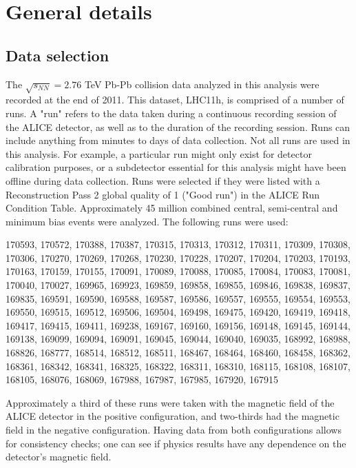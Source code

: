 \section{General details}
\label{sec:GeneralDetails}



\subsection{Data selection}
\label{sec:DataSelection}

The $\sqrt{s_{NN}}=2.76$ TeV Pb-Pb collision data analyzed in this analysis were recorded at the end of 2011.
This dataset, LHC11h, is comprised of a number of runs.
A "run" refers to the data taken during a continuous recording session of the ALICE detector, as well as to the duration of the recording session.
Runs can include anything from minutes to days of data collection.
Not all runs are used in this analysis.
For example, a particular run might only exist for detector calibration purposes, or a subdetector essential for this analysis might have been offline during data collection.
Runs were selected if they were listed with a Reconstruction Pass 2 global quality of 1 ("Good run") in the ALICE Run Condition Table. 
Approximately 45 million combined central, semi-central and minimum bias events were analyzed. 
The following runs were used:

170593, 170572, 170388, 170387, 170315, 170313, 170312, 170311, 170309, 170308, 170306, 170270, 170269, 170268, 170230, 170228, 170207, 170204, 170203, 170193, 170163, 170159, 170155, 170091, 170089, 170088, 170085, 170084, 170083, 170081, 170040, 170027, 169965, 169923, 169859, 169858, 169855, 169846, 169838, 169837, 169835, 169591, 169590, 169588, 169587, 169586, 169557, 169555, 169554, 169553, 169550, 169515, 169512, 169506, 169504, 169498, 169475, 169420, 169419, 169418, 169417, 169415, 169411, 169238, 169167, 169160, 169156, 169148, 169145, 169144, 169138, 169099, 169094, 169091, 169045, 169044, 169040, 169035, 168992, 168988, 168826, 168777, 168514, 168512, 168511, 168467, 168464, 168460, 168458, 168362, 168361, 168342, 168341, 168325, 168322, 168311, 168310, 168115, 168108, 168107, 168105, 168076, 168069, 167988, 167987, 167985, 167920, 167915

Approximately a third of these runs were taken with the magnetic field of the ALICE detector in the positive configuration, and two-thirds had the magnetic field in the negative configuration.
Having data from both configurations allows for consistency checks; one can see if physics results have any dependence on the detector's magnetic field.

